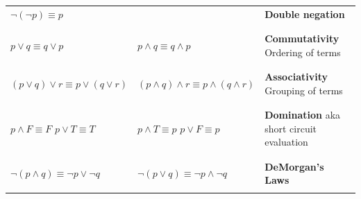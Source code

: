 \documentclass[12pt, oneside]{article}
\begin{document}
\begin{tabular}{llp{3in}}
$\lnot ( \lnot p) \equiv p$ & & {\bf Double negation}\\
&& \\
&& \\
$p \lor q \equiv q \lor p$ & $p \land q \equiv q \land p$ & {\bf Commutativity} Ordering of terms\\
&& \\
&& \\
$(p \lor q) \lor r  \equiv p \lor (q \lor r)$ & $(p \land q) \land r  \equiv p \land (q \land r)$ & {\bf Associativity} Grouping of terms\\
&& \\
&& \\
$p \land F \equiv F$ \qquad $p \lor T \equiv T$ & $p \land T \equiv p$ \qquad $p \lor F \equiv p$ & {\bf Domination} aka 
short circuit evaluation\\
&& \\
&& \\
$\lnot (p \land q) \equiv \lnot p \lor \lnot q$ & $\lnot (p \lor q) \equiv \lnot p \land\lnot q$  & {\bf DeMorgan's Laws}\\
&& \\
\end{tabular}
 \vfill
\end{document}
